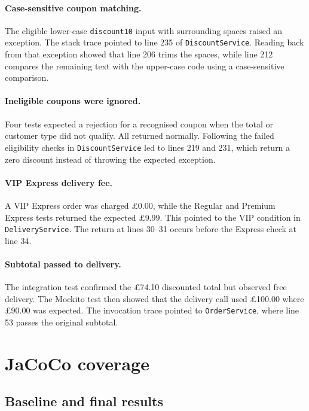 \paragraph{Case-sensitive coupon matching.}
The eligible lower-case \texttt{discount10} input with surrounding
spaces raised an exception. The stack trace pointed to line 235 of
\texttt{DiscountService}. Reading back from that exception showed that
line 206 trims the spaces, while line 212 compares the remaining text
with the upper-case code using a case-sensitive comparison.

\paragraph{Ineligible coupons were ignored.}
Four tests expected a rejection for a recognised coupon when the total
or customer type did not qualify. All returned normally. Following
the failed eligibility checks in \texttt{DiscountService} led to
lines 219 and 231, which return a zero discount instead of throwing
the expected exception.

\paragraph{VIP Express delivery fee.}
A VIP Express order was charged \pounds0.00, while the Regular and
Premium Express tests returned the expected \pounds9.99. This pointed
to the VIP condition in \texttt{DeliveryService}. The return at
lines 30--31 occurs before the Express check at line 34.

\paragraph{Subtotal passed to delivery.}
The integration test confirmed the \pounds74.10 discounted total but
observed free delivery. The Mockito test then showed that the delivery
call used \pounds100.00 where \pounds90.00 was expected. The
invocation trace pointed to \texttt{OrderService}, where line 53
passes the original subtotal.

\section{JaCoCo coverage}
\subsection{Baseline and final results}

